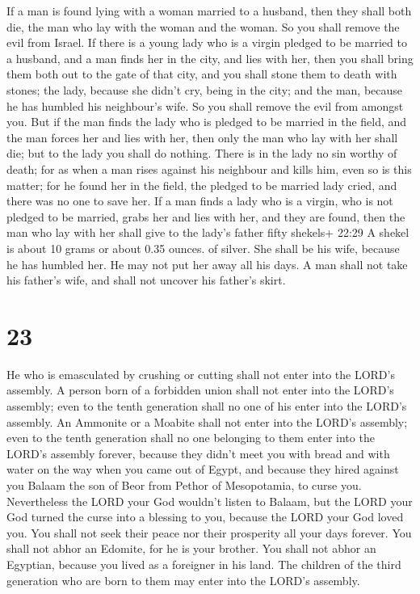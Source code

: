  If a man is found lying with a woman married to a husband,
then they shall both die, the man who lay with the woman and the woman.
So you shall remove the evil from Israel.  If there is a
young lady who is a virgin pledged to be married to a husband, and a man
finds her in the city, and lies with her,  then you shall
bring them both out to the gate of that city, and you shall stone them
to death with stones; the lady, because she didn't cry, being in the
city; and the man, because he has humbled his neighbour's wife. So you
shall remove the evil from amongst you.  But if the man
finds the lady who is pledged to be married in the field, and the man
forces her and lies with her, then only the man who lay with her shall
die;  but to the lady you shall do nothing. There is in the
lady no sin worthy of death; for as when a man rises against his
neighbour and kills him, even so is this matter;  for he
found her in the field, the pledged to be married lady cried, and there
was no one to save her.  If a man finds a lady who is a
virgin, who is not pledged to be married, grabs her and lies with her,
and they are found,  then the man who lay with her shall
give to the lady's father fifty shekels+ 22:29 A shekel is about 10
grams or about 0.35 ounces. of silver. She shall be his wife, because he
has humbled her. He may not put her away all his days.  A
man shall not take his father's wife, and shall not uncover his father's
skirt.

\hypertarget{section-22}{%
\section{23}\label{section-22}}

 He who is emasculated by crushing or cutting shall not
enter into the LORD's assembly.  A person born of a
forbidden union shall not enter into the LORD's assembly; even to the
tenth generation shall no one of his enter into the LORD's assembly.
 An Ammonite or a Moabite shall not enter into the LORD's
assembly; even to the tenth generation shall no one belonging to them
enter into the LORD's assembly forever,  because they didn't
meet you with bread and with water on the way when you came out of
Egypt, and because they hired against you Balaam the son of Beor from
Pethor of Mesopotamia, to curse you.  Nevertheless the LORD
your God wouldn't listen to Balaam, but the LORD your God turned the
curse into a blessing to you, because the LORD your God loved you.
 You shall not seek their peace nor their prosperity all
your days forever.  You shall not abhor an Edomite, for he
is your brother. You shall not abhor an Egyptian, because you lived as a
foreigner in his land.  The children of the third generation
who are born to them may enter into the LORD's assembly.

